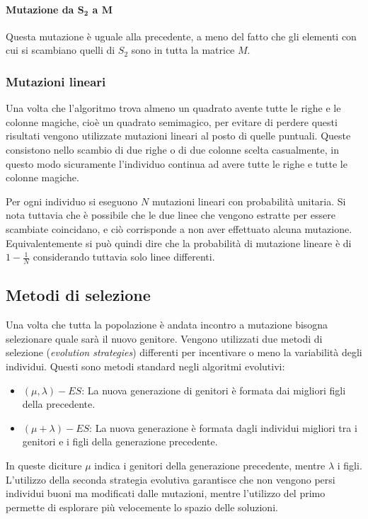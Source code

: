\documentclass[italian,twoside,twocolumn]{article}
\begin{document}
\paragraph{Mutazione da $ \mathbf{S_2} $ a $ \mathbf{M} $}
Questa mutazione è uguale alla precedente, a meno del fatto che gli elementi con cui si scambiano quelli di $ S_2 $ sono in tutta la matrice $ M $.

\subsubsection{Mutazioni lineari}
Una volta che l'algoritmo trova almeno un quadrato avente tutte le righe e le colonne magiche, cioè un quadrato semimagico, per evitare di perdere questi risultati vengono utilizzate mutazioni lineari al posto di quelle puntuali. Queste consistono nello scambio di due righe o di due colonne scelta casualmente, in questo modo sicuramente l'individuo continua ad avere tutte le righe e tutte le colonne magiche. 

Per ogni individuo si eseguono $ N $ mutazioni lineari con probabilità unitaria. Si nota tuttavia che è possibile che le due linee che vengono estratte per essere scambiate coincidano, e ciò corrisponde a non aver effettuato alcuna mutazione. Equivalentemente si può quindi dire che la probabilità di mutazione lineare è di $ 1 - \frac{1}{N} $ considerando tuttavia solo linee differenti. 

\subsection{Metodi di selezione}
Una volta che tutta la popolazione è andata incontro a mutazione bisogna selezionare quale sarà il nuovo genitore. Vengono utilizzati due metodi di selezione (\emph{evolution strategies}) differenti per incentivare o meno la variabilità degli individui. Questi sono metodi standard negli algoritmi evolutivi:
\begin{itemize}
	\item$ (\mu, \lambda)-ES $: La nuova generazione di genitori è formata dai migliori figli della precedente.
	\item $ (\mu + \lambda)-ES $: La nuova generazione è formata dagli individui migliori tra i genitori e i figli della generazione precedente.
\end{itemize}
In queste diciture $ \mu $ indica i genitori della generazione precedente, mentre $ \lambda $ i figli. 
L'utilizzo della seconda strategia evolutiva garantisce che non vengono persi individui buoni ma modificati dalle mutazioni, mentre l'utilizzo del primo permette di esplorare più velocemente lo spazio delle soluzioni. 
\end{document}
